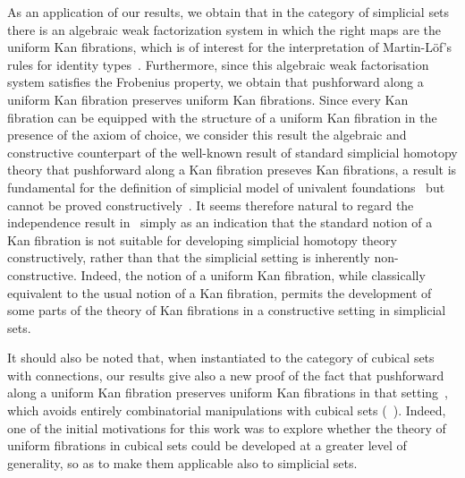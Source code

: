 \documentclass[reqno,10pt,a4paper,oneside,draft]{amsart}
\begin{document}
As an application of our results, we obtain that in the category of simplicial sets
there is an algebraic weak factorization system in which the right maps are the 
uniform Kan fibrations, which is of interest for the interpretation of Martin-L\"of's rules for identity types~\cite{awodey-warren:homotopy-idtype,garner:topological-simplicial,gambino-garner:idtypewfs}. Furthermore, since this algebraic weak factorisation system satisfies
the Frobenius property, we obtain that pushforward along 
a uniform Kan fibration preserves uniform Kan fibrations. Since 
every Kan fibration can be equipped with the structure of a uniform Kan fibration
in the presence of the axiom of choice, we consider this result the algebraic 
and constructive counterpart of the well-known result of standard simplicial homotopy 
theory that pushforward along a  Kan fibration preseves  Kan fibrations,
a result is fundamental for the definition of simplicial model of univalent foundations~\cite[Lemma~2.3.1]{voevodsky-simplicial-model} but cannot be proved constructively~\cite{coquand-non-constructivity-kan}. It seems therefore natural to regard the independence result in~\cite{coquand-non-constructivity-kan} simply as an indication that the standard notion of a Kan fibration is not suitable for developing simplicial homotopy theory constructively, rather than that the simplicial setting is inherently non-constructive.
Indeed, the notion of a uniform Kan fibration, while classically equivalent to the usual notion of a Kan fibration, permits the development of some parts of the theory of Kan fibrations in a constructive setting in simplicial sets.


 
It should also be noted that, when instantiated to the category of cubical sets with connections, our results give also a new proof of the fact that pushforward along a uniform Kan fibration preserves uniform Kan fibrations in that setting~\cite{cohen-et-al:cubicaltt}, which avoids entirely combinatorial manipulations with cubical sets (\cf~\cite{huber-thesis}). Indeed, one of the initial motivations for this work was to explore whether the theory of uniform fibrations
in cubical sets could be developed at a greater level of generality, so as to make them applicable also to simplicial sets. 
\end{document}
